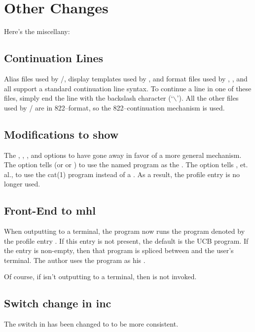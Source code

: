 \section*	{Other Changes}
Here's the miscellany:

\subsection*	{Continuation Lines}
Alias files used by \MH/,
display templates used by ,
and format files used by , , and  all support
a standard continuation line syntax.
To continue a line in one of these files,
simply end the line with the backslash character (`$\backslash$').
All the other files used by \MH/ are in 822--format,
so the 822--continuation mechanism is used.%

\subsection*	{Modifications to show}
The , , , and 
options to  have gone away in favor of a more general mechanism.
The  option tells 
(or  or ) to use the named program as the .
The  option tells , et. al.,
to use the \man cat(1) program instead of a .
As a result, the profile entry  is no longer used.

\subsection*	{Front-End to mhl}
When outputting to a terminal,
the  program now runs the program denoted by the profile entry
.
If this entry is not present,
the default is the UCB  program.
If the entry is non-empty,
then that program is spliced between  and the user's terminal.
The author uses the  program as his .

Of course,
if  isn't outputting to a terminal,
then  is not invoked.

\subsection*	{Switch change in inc}
The  switch in  has been changed to
 to be more consistent.

